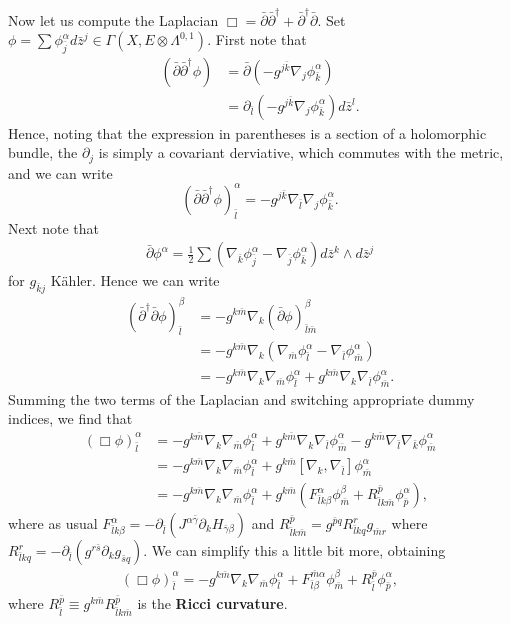\documentclass{../mathnotes}
\begin{document}
Now let us compute the Laplacian $\Box=\bar\partial\bar\partial^\dagger+\bar\partial^\dagger\bar\partial$. Set $\phi=\sum \phi^\alpha_{\bar j}d\bar z^j\in\Gamma(X,E\otimes\Lambda^{0,1})$.
First note that
\begin{align*}
    \left( \bar\partial\bar\partial^{\dagger}\phi \right)&=\bar\partial\left( -g^{j\bar k}\nabla_j\phi^{\alpha}_{\bar k} \right)\\
    &=\partial_{\bar l}\left( -g^{j\bar k}\nabla_j\phi_{\bar k}^\alpha \right)d\bar z^l.
\end{align*}
Hence, noting that the expression in parentheses is a section of a holomorphic bundle, the $\partial_j$ is simply a covariant derviative, which
commutes with the metric, and we can write
\[\left( \bar\partial\bar\partial^{\dagger}\phi \right)^\alpha_{\bar l}=-g^{j\bar k}\nabla_{\bar l}\nabla_{j}\phi^\alpha_{\bar k}.\]
Next note that
\begin{align*}
    \bar\partial\phi^\alpha=\frac{1}{2}\sum\left( \nabla_{\bar k}\phi^\alpha_{\bar j}-\nabla_{\bar j}\phi^\alpha_{\bar k} \right)d\bar z^k\wedge d\bar z^j
\end{align*}
for $g_{\bar kj}$ K\"ahler. Hence we can write
\begin{align*}
    \left( \bar\partial^\dagger\bar\partial\phi \right)^\beta_{\bar l}&=-g^{k\bar m}\nabla_{k}(\bar\partial\phi)^\beta_{\bar l\bar m}\\
    &=-g^{k\bar m}\nabla_k\left( \nabla_{\bar m}\phi^\alpha_{\bar l}-\nabla_{\bar l}\phi^\alpha_{\bar m} \right)\\
    &=-g^{k\bar m}\nabla_k\nabla_{\bar m}\phi^\alpha_{\bar l}+g^{k\bar m}\nabla_k\nabla_{\bar l}\phi^\alpha_{\bar m}.
\end{align*}
Summing the two terms of the Laplacian and switching appropriate dummy indices, we find that
\begin{align*}
    (\Box\phi)^\alpha_{\bar l}&=-g^{k\bar m}\nabla_k\nabla_{\bar m}\phi^\alpha_{\bar l}+g^{k\bar m}\nabla_k\nabla_{\bar l}\phi^\alpha_{\bar m}-g^{k\bar m}\nabla_{\bar l}\nabla_{\bar k}\phi^\alpha_{\bar m}\\
    &=-g^{k\bar m}\nabla_k\nabla_{\bar m}\phi^\alpha_{\bar l}+g^{k\bar m}[\nabla_k,\nabla_{\bar l}]\phi^\alpha_{\bar m}\\
    &=-g^{k\bar m}\nabla_k\nabla_{\bar m}\phi^\alpha_{\bar l}+g^{k\bar m}\left( F_{\bar lk\beta}^\alpha\phi^\beta_{\bar m}+R_{\bar lk\bar m}^{\bar p}\phi^\alpha_{\bar p} \right),
\end{align*}
where as usual $F_{\bar lk\beta}^\alpha=-\partial_{\bar l}\left( J^{\alpha\bar\gamma}\partial_k H_{\bar\gamma\beta} \right)$
and $R_{\bar lk\bar m}^{\bar p}=g^{\bar pq}R_{\bar lkq}^rg_{\bar mr}$ where $R_{\bar lkq}^r=-\partial_{\bar l}\left( g^{r\bar s}\partial_kg_{\bar sq} \right)$.
We can simplify this a little bit more, obtaining
\begin{align}
    (\Box\phi)^\alpha_{\bar l}=-g^{k\bar m}\nabla_k\nabla_{\bar m}\phi^\alpha_{\bar l}+F_{\bar l\beta}^{\bar m\alpha}\phi^\beta_{\bar m}+R_{\bar l}^{\bar p}\phi^\alpha_{\bar p},
\end{align}
where $R_{\bar l}^{\bar p}\equiv g^{k\bar m}R_{\bar lk\bar m}^{\bar p}$ is the \textbf{Ricci curvature}.
\end{document}
